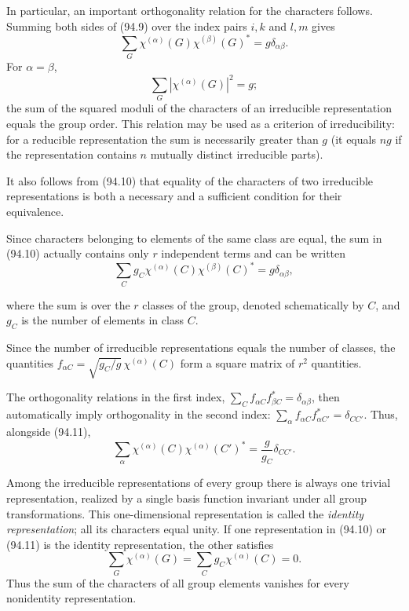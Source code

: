 In particular, an important orthogonality relation for the characters follows. Summing both sides of (94.9) over the index pairs $i,k$ and $l,m$ gives
\begin{equation}
 \sum_G\chi^{(\alpha)}(G)\chi^{(\beta)}(G)^*=g\delta_{\alpha\beta}.
 \tag{94.10}
\end{equation}
For $\alpha=\beta$,
\[
 \sum_G|\chi^{(\alpha)}(G)|^2=g;
\]
the sum of the squared moduli of the characters of an irreducible representation equals the group order. This relation may be used as a criterion of irreducibility: for a reducible representation the sum is necessarily greater than $g$ (it equals $ng$ if the representation contains $n$ mutually distinct irreducible parts).

It also follows from (94.10) that equality of the characters of two irreducible representations is both a necessary and a sufficient condition for their equivalence.

Since characters belonging to elements of the same class are equal, the sum in (94.10) actually contains only $r$ independent terms and can be written
\begin{equation}
 \sum_Cg_C\chi^{(\alpha)}(C)\chi^{(\beta)}(C)^*=g\delta_{\alpha\beta},
 \tag{94.11}
\end{equation}

where the sum is over the $r$ classes of the group, denoted schematically by $C$, and $g_C$ is the number of elements in class $C$.

Since the number of irreducible representations equals the number of classes, the quantities $f_{\alpha C}=\sqrt{g_C/g}\,\chi^{(\alpha)}(C)$ form a square matrix of $r^2$ quantities.

The orthogonality relations in the first index, $\sum_Cf_{\alpha C}f_{\beta C}^*=\delta_{\alpha\beta}$, then automatically imply orthogonality in the second index: $\sum_\alpha f_{\alpha C}f_{\alpha C'}^*=\delta_{CC'}$. Thus, alongside (94.11),
\begin{equation}
 \sum_\alpha\chi^{(\alpha)}(C)\chi^{(\alpha)}(C')^*=\frac{g}{g_C}\delta_{CC'}.
 \tag{94.12}
\end{equation}

Among the irreducible representations of every group there is always one trivial representation, realized by a single basis function invariant under all group transformations. This one-dimensional representation is called the \emph{identity representation}; all its characters equal unity. If one representation in (94.10) or (94.11) is the identity representation, the other satisfies
\begin{equation}
 \sum_G\chi^{(\alpha)}(G)=\sum_Cg_C\chi^{(\alpha)}(C)=0.
 \tag{94.13}
\end{equation}
Thus the sum of the characters of all group elements vanishes for every nonidentity representation.


